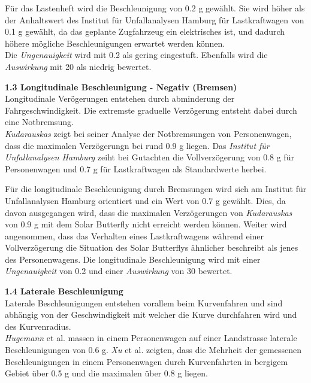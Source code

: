\begin{description}
    Für das Lastenheft wird die Beschleunigung von 0.2 g gewählt. Sie wird höher als der Anhaltswert des Institut für Unfallanalysen Hamburg für Lastkraftwagen von 0.1 g gewählt, da das geplante Zugfahrzeug ein elektrisches ist, und dadurch höhere mögliche Beschleunigungen erwartet werden können.\\
    Die \emph{Ungenauigkeit} wird mit 0.2 als gering eingestuft. Ebenfalls wird die \emph{Auswirkung} mit 20 als niedrig bewertet.

    \item \textbf{1.3 Longitudinale Beschleunigung - Negativ (Bremsen)}\\
    Longitudinale Verögerungen entstehen durch abminderung der Fahrgeschwindigkeit. Die extremste graduelle Verzögerung entsteht dabei durch eine Notbremsung.\\
    \emph{Kudarauskas} \cite{Verz.1} zeigt bei seiner Analyse der Notbremsungen von Personenwagen, dass die maximalen Verzögerungn bei rund 0.9 g liegen. Das \emph{Institut für Unfallanalysen Hamburg} \cite{Verz.2} zeiht bei Gutachten die Vollverzögerung von 0.8 g für Personenwagen und 0.7 g für Lastkraftwagen als Standardwerte herbei.

    Für die longitudinale Beschleunigung durch Bremsungen wird sich am Institut für Unfallanalysen Hamburg orientiert und ein Wert von 0.7 g gewählt. Dies, da davon ausgegangen wird, dass die maximalen Verzögerungen von \emph{Kudarauskas} von 0.9 g mit dem Solar Butterfly nicht erreicht werden können. Weiter wird angenommen, dass das Verhalten eines Lastkraftwagens während einer Vollverzögerung die Situation des Solar Butterflys ähnlicher beschreibt als jenes des Personenwagens.
    Die longitudinale Beschleunigung wird mit einer \emph{Ungenauigkeit} von 0.2 und einer \emph{Auswirkung} von 30 bewertet.

    \item \textbf{1.4 Laterale Beschleunigung}\\
    Laterale Beschleunigungen entstehen vorallem beim Kurvenfahren und sind abhängig von der Geschwindigkeit mit welcher die Kurve durchfahren wird und des Kurvenradius.\\
    \emph{Hugemann} et al. \cite{Kurv.1} massen in einem Personenwagen auf einer Landstrasse laterale Beschleunigungen von 0.6 g. \emph{Xu} et al. \cite{Kurv.2} zeigten, dass die Mehrheit der gemessenen Beschleunigungen in einem Personenwagen durch Kurvenfahrten in bergigem Gebiet über 0.5 g und die maximalen über 0.8 g liegen.


\end{description}
